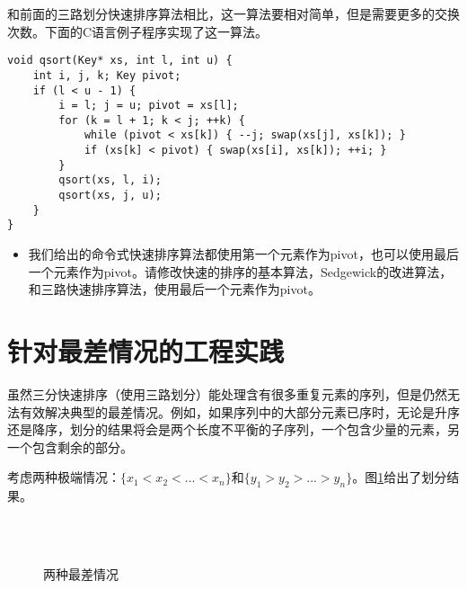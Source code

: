 \documentclass[UTF8]{article}
\begin{document}
和前面的三路划分快速排序算法相比，这一算法要相对简单，但是需要更多的交换次数。下面的C语言例子程序实现了这一算法。

\lstset{language=C}
\begin{lstlisting}
void qsort(Key* xs, int l, int u) {
    int i, j, k; Key pivot;
    if (l < u - 1) {
        i = l; j = u; pivot = xs[l];
        for (k = l + 1; k < j; ++k) {
            while (pivot < xs[k]) { --j; swap(xs[j], xs[k]); }
            if (xs[k] < pivot) { swap(xs[i], xs[k]); ++i; }
        }
        qsort(xs, l, i);
        qsort(xs, j, u);
    }
}
\end{lstlisting}

\begin{Exercise}
\begin{itemize}
\item 我们给出的命令式快速排序算法都使用第一个元素作为pivot，也可以使用最后一个元素作为pivot。请修改快速的排序的基本算法，Sedgewick的改进算法，和三路快速排序算法，使用最后一个元素作为pivot。
\end{itemize}
\end{Exercise}

\section{针对最差情况的工程实践}

虽然三分快速排序（使用三路划分）能处理含有很多重复元素的序列，但是仍然无法有效解决典型的最差情况。例如，如果序列中的大部分元素已序时，无论是升序还是降序，划分的结果将会是两个长度不平衡的子序列，一个包含少量的元素，另一个包含剩余的部分。

考虑两种极端情况：$\{ x_1 < x_2 < ... < x_n\}$和$\{ y_1 > y_2 > ... > y_n\}$。图\ref{fig:worst-cases-1}给出了划分结果。

\begin{figure}[htbp]
   \centering
    \\
    \\
   \caption{两种最差情况}
   \label{fig:worst-cases-1}
\end{figure}
\end{document}

